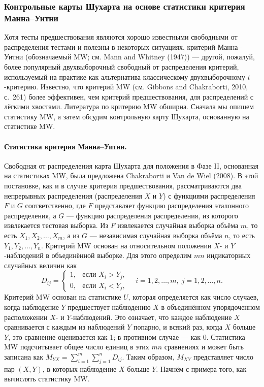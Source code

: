 \subsubsection{Контрольные карты Шухарта на основе статистики критерия Манна--Уитни}
Хотя тесты предшествования являются хорошо известными свободными от распределения тестами и полезны в некоторых ситуациях, критерий Манна--Уитни (обозначаемый MW; см. Mann and Whitney (1947)) --- другой, пожалуй, более популярный двухвыборочный свободный от распределения критерий, используемый на практике как альтернатива классическому двухвыборочному \(t\)-критерию. Известно, что критерий MW (см. Gibbons and Chakraborti, 2010, с.~261) более эффективен, чем критерий предшествования, для распределений с лёгкими хвостами. Литература по критерию MW обширна. Сначала мы опишем статистику MW, а затем обсудим контрольную карту Шухарта, основанную на статистике MW.

\paragraph{Статистика критерия Манна--Уитни.} Свободная от распределения карта Шухарта для положения в Фазе II, основанная на статистиках MW, была предложена Chakraborti и Van de Wiel (2008). В этой постановке, как и в случае критерия предшествования, рассматриваются два непрерывных распределения (распределения \(X\) и \(Y\)) с функциями распределения \(F\) и \(G\) соответственно, где \(F\) представляет функцию распределения эталонного распределения, а \(G\) --- функцию распределения распределения, из которого извлекается тестовая выборка. Из \(F\) извлекается случайная выборка объёма \(m\), то есть \(X_1, X_2, \ldots, X_m\), а из \(G\) --- независимая случайная выборка объёма \(n\), то есть \(Y_1, Y_2, \ldots, Y_n\). Критерий MW основан на относительном положении \(X\)- и \(Y\)-наблюдений в объединённой выборке. Для этого определим \(mn\) индикаторных случайных величин как
\[
	D_{ij} = \begin{cases} 1, & \text{если } X_i > Y_j, \\ 0, & \text{если } X_i < Y_j, \end{cases} \quad i = 1, 2, \ldots, m,\; j = 1, 2, \ldots, n.
\]
Критерий MW основан на статистике \(U\), которая определяется как число случаев, когда наблюдение \(Y\) предшествует наблюдению \(X\) в объединённом упорядоченном расположении \(X\)- и \(Y\)-наблюдений. Это означает, что каждое наблюдение \(X\) сравнивается с каждым из наблюдений \(Y\) попарно, и всякий раз, когда \(X\) больше \(Y\), это сравнение оценивается как 1; в противном случае --- как 0. Статистика MW подсчитывает общее число единиц в этих \(mn\) сравнениях и может быть записана как \(M_{YX} = \sum_{i=1}^{m}\sum_{j=1}^{n} D_{ij}\). Таким образом, \(M_{XY}\) представляет число пар \((X, Y)\), в которых наблюдение \(X\) больше \(Y\). Начнём с примера того, как вычислять статистику MW.

